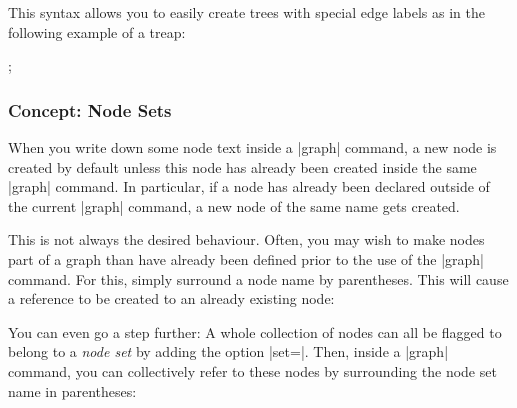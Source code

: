 This syntax allows you to easily create trees with special edge
labels as in the following example of a treap:

\begin{codeexample}[]
\tikz 
  ;
\end{codeexample}



\subsubsection{Concept: Node Sets}

When you write down some node text inside a |graph| command, a new
node is created by default unless this node has already been created
inside the same |graph| command. In particular, if a node has
already been declared outside of the current |graph| command, a new
node of the same name gets created.

This is not always the desired behaviour. Often, you may wish to make
nodes part of a graph than have already been defined prior to the use
of the |graph| command. For this, simply surround a node name by
parentheses. This will cause a reference to be created to an already
existing node:

\begin{codeexample}[]
\end{codeexample}

You can even go a step further: A whole collection of nodes can all be
flagged to belong to a \emph{node set} by adding the option
|set=|. Then, inside a |graph| command, you can
collectively refer to these nodes by surrounding the node set name in
parentheses: 

\begin{codeexample}[]
\end{codeexample}



